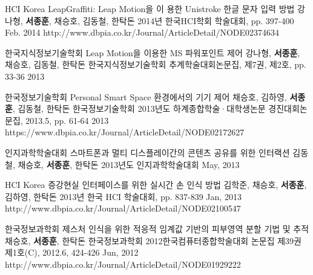 \begin{cventries}
  \cvpublicationentry
    {HCI Korea} %
    {LeapGraffiti: Leap Motion을 이 용한 Unistroke 한글 문자 입력 방법} %
    {강나형, \textbf{서종훈}, 채승호, 김동철, 한탁돈} %
    {2014년 한국HCI학회 학술대회, pp. 397-400}
    {Feb. 2014} %
    {http://www.dbpia.co.kr/Journal/ArticleDetail/NODE02374634}

  \cvpublicationentry
    {한국지식정보기술학회} %
    {Leap Motion을 이용한 MS 파워포인트 제어} %
    {강나형, \textbf{서종훈}, 채승호, 김동철, 한탁돈} %
    {한국지식정보기술학회 추계학술대회논문집, 제7권, 제2호, pp. 33-36}
    {2013} %
    {}

  \cvpublicationentry
    {한국정보기술학회} %
    {Personal Smart Space 환경에서의 기기 제어} %
    {채승호, 김하영, \textbf{서종훈}, 김동철, 한탁돈} %
    {한국정보기술학회 2013년도 하계종합학술·대학생논문 경진대회논문집, 2013.5, pp. 61-64}
    {2013} %
    {https://www.dbpia.co.kr/Journal/ArticleDetail/NODE02172627}

  \cvpublicationentry
    {인지과학학술대회} %
    {스마트폰과 멀티 디스플레이간의 콘텐츠 공유를 위한 인터랙션} %
    {김동철, 채승호, \textbf{서종훈}, 한탁돈} %
    {2013년도 인지과학학술대회}
    {May, 2013} %
    {}

  \cvpublicationentry
    {HCI Korea} %
    {증강현실 인터페이스를 위한 실시간 손 인식 방법} %
    {김학준, 채승호, \textbf{서종훈}, 김하영, 한탁돈} %
    {2013년 한국 HCI 학술대회, pp. 837-839}
    {Jan, 2013} %
    {http://www.dbpia.co.kr/Journal/ArticleDetail/NODE02100547}

  \cvpublicationentry
    {한국정보과학회} %
    {제스처 인식을 위한 적응적 임계값 기반의 피부영역 분할 기법 및 추적} %
    {채승호, \textbf{서종훈}, 한탁돈} %
    {한국정보과학회 2012한국컴퓨터종합학술대회 논문집 제39권 제1호(C), 2012.6, 424-426}
    {Jun, 2012} %
    {http://www.dbpia.co.kr/Journal/ArticleDetail/NODE01929222}


\end{cventries}
